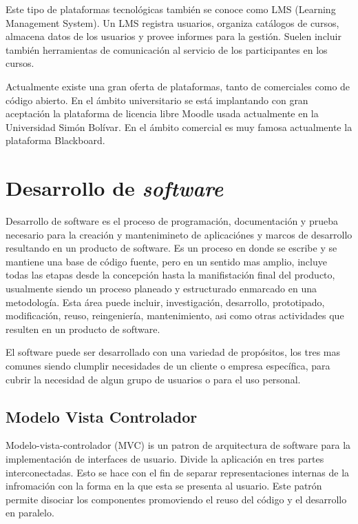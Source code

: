 Este tipo de plataformas tecnológicas también se conoce como LMS (Learning Management System). Un LMS registra usuarios, organiza catálogos de cursos, almacena datos de los usuarios y provee informes para la gestión. Suelen incluir también herramientas de comunicación al servicio de los participantes en los cursos. 

Actualmente existe una gran oferta de plataformas, tanto de comerciales como de código abierto. En el ámbito universitario se está implantando con gran aceptación la plataforma de licencia libre Moodle usada actualmente en la Universidad Simón Bolívar. En el ámbito comercial es muy famosa actualmente la plataforma Blackboard.

\section{Desarrollo de \emph{software}}

Desarrollo de software es el proceso de programación, documentación y prueba necesario para la creación y mantenimineto de aplicaciónes y marcos de desarrollo resultando en un producto de software. Es un proceso en donde se escribe y se mantiene una base de código fuente, pero en un sentido mas amplio, incluye todas las etapas desde la concepción hasta la manifistación final del producto, usualmente siendo un proceso planeado y estructurado enmarcado en una metodología. Esta área puede incluir, investigación, desarrollo, prototipado, modificación, reuso, reingeniería, mantenimiento, asi como otras actividades que resulten en un producto de software.

El software puede ser desarrollado con una variedad de propósitos, los tres mas comunes siendo clumplir necesidades de un cliente o empresa específica, para cubrir la necesidad de algun grupo de usuarios o para el uso personal.

\subsection{Modelo Vista Controlador}

Modelo-vista-controlador (MVC) is un patron de arquitectura de software para la implementación de interfaces de usuario. Divide la aplicación en tres partes interconectadas. Esto se hace con el fin de separar representaciones internas de la infromación con la forma en la que esta se presenta al usuario. Este patrón permite disociar los componentes promoviendo el reuso del código y el desarrollo en paralelo.

